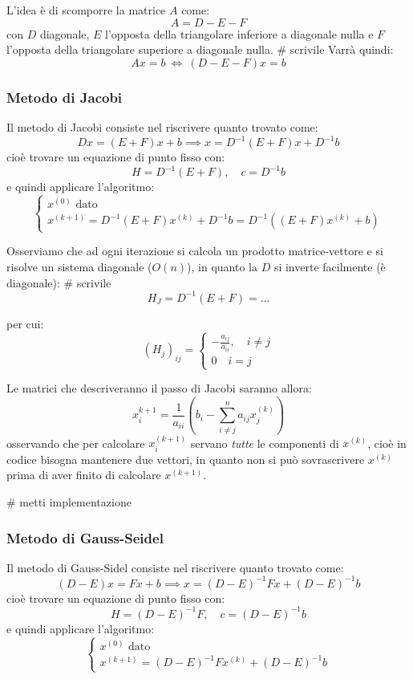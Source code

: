 \documentclass[a4paper,11pt]{article}
\begin{document}
L'idea è di scomporre la matrice $A$ come:
$$
A = D - E - F
$$
con $D$ diagonale, $E$ l'opposta della triangolare inferiore a diagonale nulla e $F$ l'opposta della triangolare superiore a diagonale nulla. # scrivile
Varrà quindi:
$$
Ax = b \ \Leftrightarrow \ (D - E - F) x = b
$$

\subsubsection{Metodo di Jacobi}
Il metodo di Jacobi consiste nel riscrivere quanto trovato come:
$$
D x = (E + F) x + b \implies x = D^{-1} (E + F) x + D^{-1} b
$$
cioè trovare un equazione di punto fisso con:
$$
H = D^{-1} (E + F), \quad c = D^{-1} b
$$
e quindi applicare l'algoritmo:\[
	\begin{cases}
		x^{(0)} \text{ dato} \\
		x^{(k + 1)} = D^{-1} (E + F) x^{(k)} + D^{-1} b = D^{-1} ( (E + F) x^{(k)} + b )
	\end{cases}
\]

Osserviamo che ad ogni iterazione si calcola un prodotto matrice-vettore e si risolve un sistema diagonale ($O(n)$), in quanto la $D$ si inverte facilmente (è diagonale): # scrivile
$$
H_J = D^{-1} (E + F) = ...
$$

per cui:
$$
(H_j)_{ij} = 
\begin{cases}
	-\frac{ a_{ij} }{a_{ii}}, \quad i \neq j \\ 
	0 \quad i = j
\end{cases}
$$

Le matrici che descriveranno il passo di Jacobi saranno allora:
$$
x_i^{k + 1} = \frac{1}{a_{ii}} \left( b_i - \sum_{i \neq j}^n a_{ij} x_j^{(k)}  \right)
$$
osservando che per calcolare $x_i^{(k + 1)}$ servano \textit{tutte} le componenti di $x^{(k)}$, cioè in codice bisogna mantenere due vettori, in quanto non si può sovrascrivere $x^{(k)}$ prima di aver finito di calcolare $x^{(k + 1)}$.

# metti implementazione

\subsubsection{Metodo di Gauss-Seidel}
Il metodo di Gauss-Sidel consiste nel riscrivere quanto trovato come:
$$
(D - E) x = F x + b \implies x = (D - E)^{-1} F x + (D - E)^{-1} b
$$cioè trovare un equazione di punto fisso con:
$$
H = (D - E)^{-1} F, \quad c = (D - E)^{-1} b 
$$
e quindi applicare l'algoritmo:\[
	\begin{cases}
		x^{(0)} \text{ dato} \\
		x^{(k + 1)} = (D - E)^{-1} F x^{(k)} + (D - E)^{-1} b
	\end{cases}
\]
\end{document}
